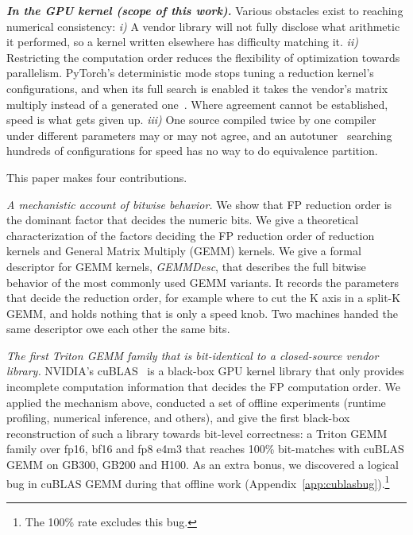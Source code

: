 \documentclass[sigplan,nonacm]{acmart}
\begin{document}
\textbf{\textit{In the GPU kernel (scope of this work).}} 
Various obstacles exist to reaching numerical consistency:
\emph{i)} A vendor library will not fully disclose what arithmetic it performed, so a
kernel written elsewhere has difficulty matching it.
\emph{ii)} Restricting the computation order 
reduces the flexibility of optimization towards parallelism. 
PyTorch's deterministic mode stops tuning a reduction kernel's
configurations, and when its full search is enabled it takes the vendor's matrix
multiply instead of a generated one~\cite{pytorch_determinism}. 
Where agreement cannot be established, speed is what gets given up.
\emph{iii)} One source compiled twice by one compiler under different parameters
may or may not agree, and an autotuner~\cite{tvm2018,ansor2020} searching
hundreds of configurations for speed has no way to do equivalence partition.

This paper makes four contributions.



\textit{A mechanistic account of bitwise behavior.} 
We show that FP reduction order is the dominant factor that decides the numeric bits.
We give a theoretical characterization of the factors deciding the FP reduction
order of reduction kernels and General Matrix Multiply (GEMM) kernels.
We give a formal descriptor
for GEMM kernels, \emph{GEMMDesc}, that describes the full bitwise behavior of
the most commonly used GEMM variants. It records the parameters that decide the
reduction order, for example where to cut the K axis in a split-K GEMM, and
holds nothing that is only a speed knob. Two machines handed the same descriptor
owe each other the same bits.

\textit{The first Triton GEMM family that is bit-identical to a
closed-source vendor library.} NVIDIA's cuBLAS~\cite{cublas_docs} is a black-box GPU kernel
library that only provides incomplete computation information that decides the
FP computation order.
We applied the mechanism above, conducted a set of offline experiments
(runtime profiling, numerical inference, and others), and give the first
black-box reconstruction of such a library towards bit-level correctness: a
Triton GEMM family over fp16, bf16 and fp8 e4m3 that reaches 100\% bit-matches
with cuBLAS GEMM on GB300, GB200 and H100. As an extra bonus, we discovered a logical bug in
cuBLAS GEMM during that offline work
(Appendix~\ref{app:cublasbug}).\footnote{The 100\% rate excludes this bug.}
\end{document}
